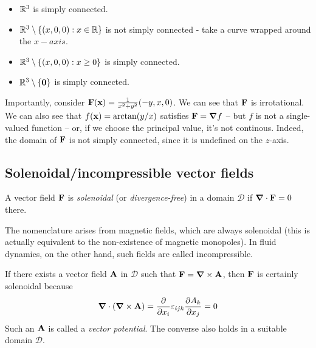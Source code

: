 \documentclass{../template/note}
\begin{document}
    \begin{example*}
        \begin{itemize}
            \item \(\mathbb R^3\) is simply connected.
            \item \(\mathbb R^3 \setminus \{(x, 0, 0): x \in \mathbb R\}\) is not simply connected - take a curve wrapped around the \(x-axis\).
            \item \(\mathbb R^3 \setminus \{(x, 0, 0): x \geq 0\}\) is simply connected.
            \item \(\RR^3 \setminus \{\V 0\}\) is simply connected.
        \end{itemize}
        Importantly, consider \(\V F(\V x) = \frac{1}{x^2+y^2}(-y, x, 0)\). We can see that \(\V F\) is irrotational. We can also see that \(f(\V x) = \arctan(y/x)\) satisfies \(\V F = \grad f\) -- but \(f\) is not a single-valued function -- or, if we choose the principal value, it's not continous. Indeed, the domain of \(\V F\) is not simply connected, since it is undefined on the \(z\)-axis.
    \end{example*}

    
    \subsection{Solenoidal/incompressible vector fields}

    \begin{definition*}
        A vector field \(\V F\) is \emph{solenoidal} (or \emph{divergence-free}) in a domain \(\mathscr D\) if \(\div \V F = 0\) there.
    \end{definition*}
    
    \begin{remark*}
        The nomenclature arises from magnetic fields, which are always solenoidal (this is actually equivalent to the non-existence of magnetic monopoles). In fluid dynamics, on the other hand, such fields are called incompressible.
    \end{remark*}
    
    If there exists a vector field \(\V A\) in \(\mathscr D\) such that \(\V F = \curl \V A\), then \(\V F\) is certainly solenoidal because
    \begin{align*}
        \div(\curl \V A) = \pd{}{x_i} \lv{ijk} \pd{A_k}{x_j} = 0
    \end{align*}
    Such an \(\V A\) is called a \emph{vector potential}. The converse also holds in a suitable domain \(\mathscr D\). 
    
\end{document}
